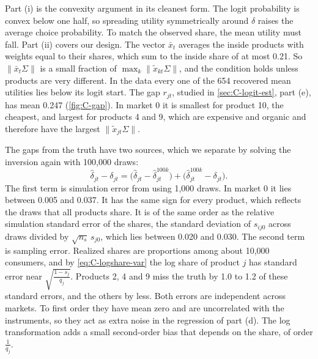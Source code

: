 Part (i) is the convexity argument in its cleanest form. The logit probability is convex below one half, so spreading
utility symmetrically around $\delta$ raises the average choice probability. To match the observed share, the mean
utility must fall. Part (ii) covers our design. The vector $\bar x_t$ averages the inside products with weights equal to
their shares, which sum to the inside share of at most 0.21. So $\|\bar x_t\Sigma\|$ is a small fraction of
$\max_k\|\tilde x_{kt}\Sigma\|$, and the condition holds unless products are very different. In the data every one of
the 654 recovered mean utilities lies below its logit start. The gap $r_{jt}$, studied in \cref{sec:C-logit-est},
part (e), has mean 0.247 (\cref{fig:C-gap}). In market 0 it is smallest for product 10, the cheapest, and largest for
products 4 and 9, which are expensive and organic and therefore have the largest $\|\tilde x_{jt}\Sigma\|$.

The gaps from the truth have two sources, which we separate by solving the inversion again with 100,000 draws:
\begin{equation}\label{eq:C-delta-gap}
  \hat\delta_{jt} - \delta_{jt} = \big(\hat\delta_{jt} - \hat\delta^{100k}_{jt}\big) + \big(\hat\delta^{100k}_{jt} -
  \delta_{jt}\big) .
\end{equation}
The first term is simulation error from using 1,000 draws. In market 0 it lies between 0.005 and 0.037. It has the same
sign for every product, which reflects the draws that all products share. It is of the same order as the relative
simulation standard error of the shares, the standard deviation of $s_{ij0}$ across draws divided by
$\sqrt{n_s}\,s_{j0}$, which lies between 0.020 and 0.030. The second term is sampling error. Realized shares are
proportions among about 10,000 consumers, and by \eqref{eq:C-logshare-var} the log share of product $j$ has standard
error near $\sqrt{\frac{1 - s_{j}}{q_{j}}}$. Products 2, 4 and 9 miss the truth by 1.0 to 1.2 of these standard errors,
and the others by less. Both errors are independent across markets. To first order they have mean zero and are uncorrelated with the
instruments, so they act as extra noise in the regression of part (d). The log transformation adds a small
second-order bias that depends on the share, of order $\frac{1}{q_j}$.

